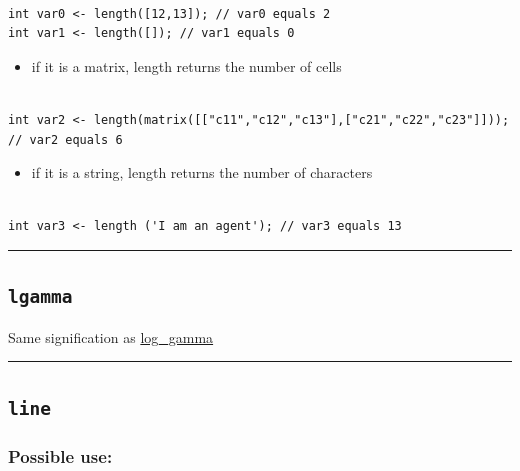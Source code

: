 \documentclass[]{book}
\providecommand{\tightlist}{%
  \setlength{\itemsep}{0pt}\setlength{\parskip}{0pt}}
\theoremstyle{definition}
\theoremstyle{definition}
\theoremstyle{definition}
\theoremstyle{remark}
\begin{document}
\begin{verbatim}
 
int var0 <- length([12,13]); // var0 equals 2 
int var1 <- length([]); // var1 equals 0
\end{verbatim}

\begin{itemize}
\tightlist
\item
  if it is a matrix, length returns the number of cells
\end{itemize}

\begin{verbatim}
 
int var2 <- length(matrix([["c11","c12","c13"],["c21","c22","c23"]])); // var2 equals 6
\end{verbatim}

\begin{itemize}
\tightlist
\item
  if it is a string, length returns the number of characters
\end{itemize}

\begin{verbatim}
 
int var3 <- length ('I am an agent'); // var3 equals 13
\end{verbatim}

\begin{center}\rule{0.5\linewidth}{\linethickness}\end{center}

\subsection{\texorpdfstring{\texttt{lgamma}}{lgamma}}\label{lgamma}

Same signification as
\href{operators-i-to-m.html\#log_gamma}{log\_gamma}

\begin{center}\rule{0.5\linewidth}{\linethickness}\end{center}

\subsection{\texorpdfstring{\texttt{line}}{line}}\label{line}

\subsubsection{Possible use:}\label{possible-use-321}
\end{document}
